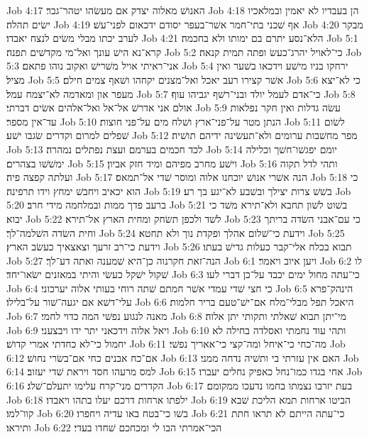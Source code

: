 Job 4:17  האנושׁ מאלוה יצדק אם מעשׂהו יטהר־גבר׃
Job 4:18  הן בעבדיו לא יאמין ובמלאכיו ישׂים תהלה׃
Job 4:19  אף שׁכני בתי־חמר אשׁר־בעפר יסודם ידכאום לפני־עשׁ׃
Job 4:20  מבקר לערב יכתו מבלי משׂים לנצח יאבדו׃
Job 4:21  הלא־נסע יתרם בם ימותו ולא בחכמה׃
Job 5:1  קרא־נא הישׁ עונך ואל־מי מקדשׁים תפנה׃
Job 5:2  כי־לאויל יהרג־כעשׂ ופתה תמית קנאה׃
Job 5:3  אני־ראיתי אויל משׁרישׁ ואקוב נוהו פתאם׃
Job 5:4  ירחקו בניו מישׁע וידכאו בשׁער ואין מציל׃
Job 5:5  אשׁר קצירו רעב יאכל ואל־מצנים יקחהו ושׁאף צמים חילם׃
Job 5:6  כי לא־יצא מעפר און ומאדמה לא־יצמח עמל׃
Job 5:7  כי־אדם לעמל יולד ובני־רשׁף יגביהו עוף׃
Job 5:8  אולם אני אדרשׁ אל־אל ואל־אלהים אשׂים דברתי׃
Job 5:9  עשׂה גדלות ואין חקר נפלאות עד־אין מספר׃
Job 5:10  הנתן מטר על־פני־ארץ ושׁלח מים על־פני חוצות׃
Job 5:11  לשׂום שׁפלים למרום וקדרים שׂגבו ישׁע׃
Job 5:12  מפר מחשׁבות ערומים ולא־תעשׂינה ידיהם תושׁיה׃
Job 5:13  לכד חכמים בערמם ועצת נפתלים נמהרה׃
Job 5:14  יומם יפגשׁו־חשׁך וכלילה ימשׁשׁו בצהרים׃
Job 5:15  וישׁע מחרב מפיהם ומיד חזק אביון׃
Job 5:16  ותהי לדל תקוה ועלתה קפצה פיה׃
Job 5:17  הנה אשׁרי אנושׁ יוכחנו אלוה ומוסר שׁדי אל־תמאס׃
Job 5:18  כי הוא יכאיב ויחבשׁ ימחץ וידו תרפינה׃
Job 5:19  בשׁשׁ צרות יצילך ובשׁבע לא־יגע בך רע׃
Job 5:20  ברעב פדך ממות ובמלחמה מידי חרב׃
Job 5:21  בשׁוט לשׁון תחבא ולא־תירא משׁד כי יבוא׃
Job 5:22  לשׁד ולכפן תשׂחק ומחית הארץ אל־תירא׃
Job 5:23  כי עם־אבני השׂדה בריתך וחית השׂדה השׁלמה־לך׃
Job 5:24  וידעת כי־שׁלום אהלך ופקדת נוך ולא תחטא׃
Job 5:25  וידעת כי־רב זרעך וצאצאיך כעשׂב הארץ׃
Job 5:26  תבוא בכלח אלי־קבר כעלות גדישׁ בעתו׃
Job 5:27  הנה־זאת חקרנוה כן־היא שׁמענה ואתה דע־לך׃
Job 6:1  ויען איוב ויאמר׃
Job 6:2  לו שׁקול ישׁקל כעשׂי והיתי במאזנים ישׂאו־יחד׃
Job 6:3  כי־עתה מחול ימים יכבד על־כן דברי לעו׃
Job 6:4  כי חצי שׁדי עמדי אשׁר חמתם שׁתה רוחי בעותי אלוה יערכוני׃
Job 6:5  הינהק־פרא עלי־דשׁא אם יגעה־שׁור על־בלילו׃
Job 6:6  היאכל תפל מבלי־מלח אם־ישׁ־טעם בריר חלמות׃
Job 6:7  מאנה לנגוע נפשׁי המה כדוי לחמי׃
Job 6:8  מי־יתן תבוא שׁאלתי ותקותי יתן אלוה׃
Job 6:9  ויאל אלוה וידכאני יתר ידו ויבצעני׃
Job 6:10  ותהי עוד נחמתי ואסלדה בחילה לא יחמול כי־לא כחדתי אמרי קדושׁ׃
Job 6:11  מה־כחי כי־איחל ומה־קצי כי־אאריך נפשׁי׃
Job 6:12  אם־כח אבנים כחי אם־בשׂרי נחושׁ׃
Job 6:13  האם אין עזרתי בי ותשׁיה נדחה ממני׃
Job 6:14  למס מרעהו חסד ויראת שׁדי יעזוב׃
Job 6:15  אחי בגדו כמו־נחל כאפיק נחלים יעברו׃
Job 6:16  הקדרים מני־קרח עלימו יתעלם־שׁלג׃
Job 6:17  בעת יזרבו נצמתו בחמו נדעכו ממקומם׃
Job 6:18  ילפתו ארחות דרכם יעלו בתהו ויאבדו׃
Job 6:19  הביטו ארחות תמא הליכת שׁבא קוו־למו׃
Job 6:20  בשׁו כי־בטח באו עדיה ויחפרו׃
Job 6:21  כי־עתה הייתם לא תראו חתת ותיראו׃
Job 6:22  הכי־אמרתי הבו לי ומכחכם שׁחדו בעדי׃
